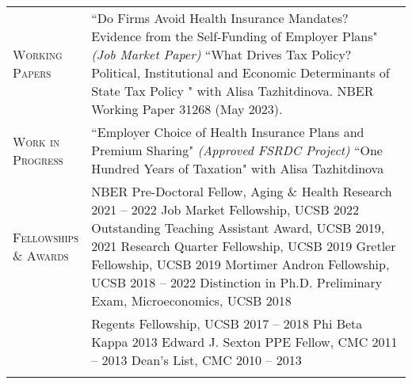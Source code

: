 \documentclass[11pt]{article}
\newcommand{\xspace}{19pt}
\begin{document}
\begin{tabularx}{\textwidth}{@{}Y Z@{}}
	\textsc{Working \newline Papers} & 
	``Do Firms Avoid Health Insurance Mandates? Evidence from the Self-Funding \newline of Employer Plans"  \textit{(Job Market Paper)}
	\vspace{10pt} \newline
	``What Drives Tax Policy? Political, Institutional and Economic Determinants of \newline State Tax Policy " with Alisa Tazhitdinova. NBER Working Paper 31268 (May 2023).
     \\ \addlinespace[\xspace] 
    
    \textsc{Work in \newline Progress}  & 
    ``Employer Choice of Health Insurance Plans and Premium Sharing"
    \newline \textit{(Approved FSRDC Project)}
    \vspace{10pt} \newline
    ``One Hundred Years of Taxation" with Alisa Tazhitdinova
     \\ \addlinespace[\xspace] 

	\textsc{Fellowships \newline \& Awards} & 
	NBER Pre-Doctoral Fellow, Aging \& Health Research \hfill 2021 -- 2022%
	\vspace{12pt} \newline
	Job Market Fellowship, UCSB \hfill 2022%
	\vspace{3pt} \newline
	Outstanding Teaching Assistant Award, UCSB \hfill 2019, 2021%
	\vspace{3pt} \newline
	Research Quarter Fellowship, UCSB \hfill 2019%
	\vspace{3pt} \newline
	Gretler Fellowship, UCSB \hfill 2019%
	\vspace{3pt} \newline 
	Mortimer Andron Fellowship, UCSB \hfill 2018 -- 2022%
	\vspace{3pt} \newline 
	Distinction in Ph.D. Preliminary Exam, Microeconomics, UCSB \hfill 2018%
		\\ \newpage & %
	Regents Fellowship, UCSB \hfill 2017 -- 2018%
	\vspace{3pt} \newline
	Phi Beta Kappa \hfill 2013%
	\vspace{3pt} \newline
	Edward J. Sexton PPE Fellow, CMC \hfill 2011 -- 2013%
	\vspace{3pt} \newline
	Dean's List, CMC \hfill 2010 -- 2013%
	 \\ \addlinespace[\xspace]  


\end{tabularx}
\end{document}
